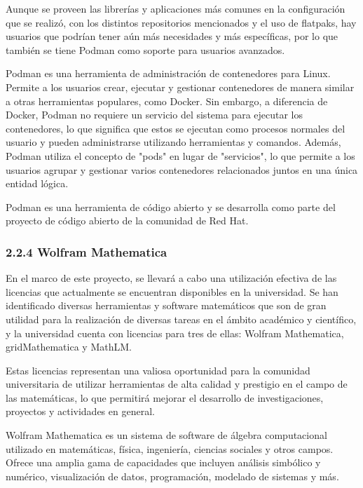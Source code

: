 \begin{doublespace}
    Aunque se proveen las librerías y aplicaciones más comunes en la configuración que se realizó, con los distintos repositorios mencionados y el uso de flatpaks, hay usuarios que podrían tener aún más necesidades y más específicas, por lo que también se tiene Podman como soporte para usuarios avanzados.

    Podman es una herramienta de administración de contenedores para Linux. Permite a los usuarios crear, ejecutar y gestionar contenedores de manera similar a otras herramientas populares, como Docker. Sin embargo, a diferencia de Docker, Podman no requiere un servicio del sistema para ejecutar los contenedores, lo que significa que estos se ejecutan como procesos normales del usuario y pueden administrarse utilizando herramientas y comandos. Además, Podman utiliza el concepto de "pods" en lugar de "servicios", lo que permite a los usuarios agrupar y gestionar varios contenedores relacionados juntos en una única entidad lógica. 
    
    Podman es una herramienta de código abierto y se desarrolla como parte del proyecto de código abierto de la comunidad de Red Hat. \cite{RHEL-podman-1}

    \subsubsection{2.2.4 Wolfram Mathematica}

    En el marco de este proyecto, se llevará a cabo una utilización efectiva de las licencias que actualmente se encuentran disponibles en la universidad. Se han identificado diversas herramientas y software matemáticos que son de gran utilidad para la realización de diversas tareas en el ámbito académico y científico, y la universidad cuenta con licencias para tres de ellas: Wolfram Mathematica, gridMathematica y MathLM.

    Estas licencias representan una valiosa oportunidad para la comunidad universitaria de utilizar herramientas de alta calidad y prestigio en el campo de las matemáticas, lo que permitirá mejorar el desarrollo de investigaciones, proyectos y actividades en general.
    
    Wolfram Mathematica es un sistema de software de álgebra computacional utilizado en matemáticas, física, ingeniería, ciencias sociales y otros campos. Ofrece una amplia gama de capacidades que incluyen análisis simbólico y numérico, visualización de datos, programación, modelado de sistemas y más. \cite{Wolfram-mathematica-1}
    

\end{doublespace}
